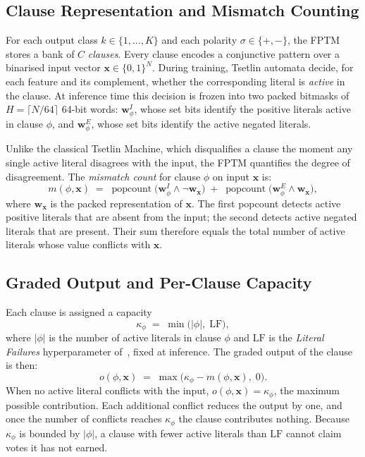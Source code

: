 \documentclass[journal,twoside,web]{ieeecolor}
\begin{document}
\subsection{Clause Representation and Mismatch Counting}
\label{sec:fptm-clause}
For each output class $k \in \{1,\ldots,K\}$ and each polarity
$\sigma \in \{+,-\}$, the FPTM stores a bank of $C$ \emph{clauses}.
Every clause encodes a conjunctive pattern over a binarised input
vector $\mathbf{x} \in \{0,1\}^{N}$.  During training, Tsetlin
automata decide, for each feature and its complement, whether the
corresponding literal is \emph{active} in the clause.  At inference
time this decision is frozen into two packed bitmasks of
$H = \lceil N/64 \rceil$ 64-bit words:
$\mathbf{w}^{I}_{\phi}$, whose set bits identify the positive
literals active in clause $\phi$, and
$\mathbf{w}^{E}_{\phi}$, whose set bits identify the active
negated literals.

Unlike the classical Tsetlin Machine, which disqualifies a clause
the moment any single active literal disagrees with the input, the
FPTM quantifies the degree of disagreement.  The
\emph{mismatch count} for clause $\phi$ on input $\mathbf{x}$ is:
%
\begin{equation}
  m(\phi,\mathbf{x})
  \;=\;
  \operatorname{popcount}\!\bigl(
      \mathbf{w}^{I}_{\phi} \wedge \neg\mathbf{w}_{\mathbf{x}}
  \bigr)
  \;+\;
  \operatorname{popcount}\!\bigl(
      \mathbf{w}^{E}_{\phi} \wedge \mathbf{w}_{\mathbf{x}}
  \bigr),
  \label{eq:mismatch}
\end{equation}
%
where $\mathbf{w}_{\mathbf{x}}$ is the packed representation of
$\mathbf{x}$. The first popcount detects active positive literals
that are absent from the input; the second detects active negated
literals that are present. Their sum therefore equals the total
number of active literals whose value conflicts with $\mathbf{x}$.

\subsection{Graded Output and Per-Clause Capacity}
\label{sec:fptm-graded}
Each clause is assigned a capacity
%
\begin{equation}
  \kappa_{\phi} \;=\; \min\!\bigl(|\phi|,\;\mathrm{LF}\bigr),
  \label{eq:kappa}
\end{equation}
%
where $|\phi|$ is the number of active literals in clause $\phi$ and
$\mathrm{LF}$ is the \emph{Literal Failures} hyperparameter
of~\cite{hnilov2025fuzzy}, fixed at inference. The graded output of
the clause is then:
%
\begin{equation}
  o(\phi,\mathbf{x})
  \;=\; \max\!\bigl(\kappa_{\phi} - m(\phi,\mathbf{x}),\;0\bigr).
  \label{eq:graded}
\end{equation}
%
When no active literal conflicts with the input,
$o(\phi,\mathbf{x}) = \kappa_{\phi}$, the maximum possible
contribution. Each additional conflict reduces the output by one,
and once the number of conflicts reaches $\kappa_{\phi}$ the clause
contributes nothing. Because $\kappa_{\phi}$ is bounded by
$|\phi|$, a clause with fewer active literals than $\mathrm{LF}$
cannot claim votes it has not earned.
\end{document}
